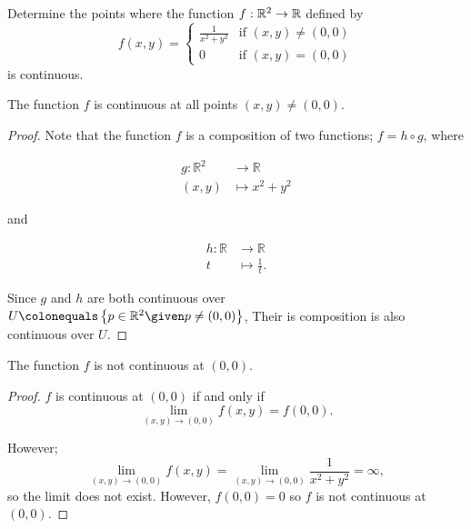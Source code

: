 \begin{problem}
  Determine the points where the function $f : \mathbb{R}^2 \to \mathbb{R}$ defined by
  \[
    f(x, y) = \begin{cases}
      \frac{1}{x^2 + y^2} & \text{if } (x, y) \neq (0, 0) \\
      0 & \text{if } (x, y) = (0, 0)
    \end{cases}
  \]
  is continuous.
\end{problem}

\begin{answer}

  \begin{claim}
    The function $f$ is continuous at all points $(x, y) \neq (0, 0)$.

    \begin{proof}
      Note that the function $f$ is a composition of two functions;
      $f = h \circ g$, where

      \begin{minipage}{0.4\textwidth}
        \begin{align*}
          g : \mathbb{R}^2 &\to \mathbb{R} \\
          (x, y) &\mapsto x^2 + y^2
        \end{align*}
      \end{minipage}%
      \begin{minipage}{0.1\textwidth}
        and
      \end{minipage}%
      \begin{minipage}{0.1\textwidth}
        \begin{align*}
          h : \mathbb{R} &\to \mathbb{R} \\
          t &\mapsto \frac{1}{t}.
        \end{align*}
      \end{minipage}

      \step
      Since $g$ and $h$ are both continuous over
      $U \colonequals \set{ p \in \R^2 \given p \neq (0, 0) }$,
      Their is composition is also continuous over $U$.
    \end{proof}
  \end{claim}

  \begin{claim}
    The function $f$ is not continuous at $(0, 0)$.

    \begin{proof}
      $f$ is continuous at $(0, 0)$ if and only if
      \[
        \lim_{(x, y) \to (0, 0)} f(x, y) = f(0, 0).
      \]

      \step
      However;
      \[
        \lim_{(x, y) \to (0, 0)} f(x, y)
        = \lim_{(x, y) \to (0, 0)} \frac{1}{x^2 + y^2}
        = \infty,
      \]
      so the limit does not exist.
      However, $f(0, 0) = 0$
      so $f$ is not continuous at $(0, 0)$.
    \end{proof}
  \end{claim}
\end{answer}
